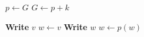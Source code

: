 \documentclass{article}
\begin{document}
\begin{algorithm}
\caption{MyTestingProcedure}

\begin{algorithmic}[1]
\State $p\gets G$
\Else
{}
\State $G\gets p+k$
\EndIf
\EndIf
\EndProcedure
\end{algorithmic}
\end{algorithm}

\begin{algorithm}
\caption{FindPathBK}

\begin{algorithmic}[1]
\State \textbf{Write} $v$
\Else
\State $w \leftarrow v$
\State \textbf{Write} $w$
\State $w \leftarrow p(w)$
\EndWhile
\EndIf
\EndProcedure
\end{algorithmic}
\end{algorithm}
\end{document}
